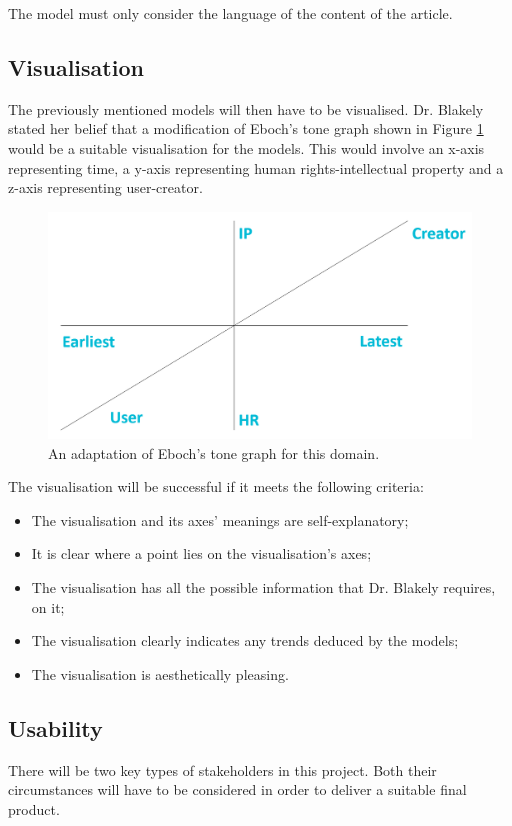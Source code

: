 			The model must only consider the language of the content of the article. 
		\subsection{Visualisation}
			The previously mentioned models will then have to be visualised. Dr. Blakely stated her belief that a modification of Eboch’s tone graph\cite{tone_graph_eboch} shown in Figure \ref{fig:eboch_adapt} would be a suitable visualisation for the models. This would involve an x-axis representing time, a y-axis representing human rights-intellectual property and a z-axis representing user-creator. 
			
			\begin{figure}[h]
    			\centering
    			\includegraphics[width=0.5\linewidth]{resources/images/eboch_adapt.png}
    			\caption{An adaptation of Eboch’s tone graph for this domain.}
    			\label{fig:eboch_adapt}
			\end{figure}
			
			The visualisation will be successful if it meets the following criteria:
			\begin{itemize}
				\item The visualisation and its axes’ meanings are self-explanatory; 
    			\item It is clear where a point lies on the visualisation’s axes; 
    			\item The visualisation has all the possible information that Dr. Blakely requires, on it; 
    			\item The visualisation clearly indicates any trends deduced by the models; 
    			\item The visualisation is aesthetically pleasing. 
			\end{itemize}
			
		\subsection{Usability}
			There will be two key types of stakeholders in this project. Both their circumstances will have to be considered in order to deliver a suitable final product. 

